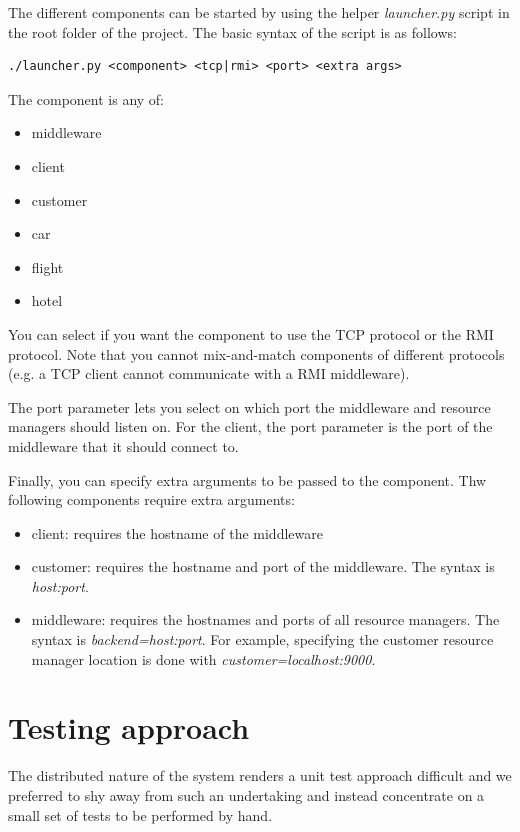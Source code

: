 \documentclass[11pt]{article}
\begin{document}
The different components can be started by using the helper {\it
  launcher.py} script in the root folder of the project.  The basic
syntax of the script is as follows:


\begin{verbatim}
./launcher.py <component> <tcp|rmi> <port> <extra args>
\end{verbatim}

The component is any of:

\begin{itemize}
\item middleware
\item client
\item customer
\item car
\item flight
\item hotel
\end{itemize}

You can select if you want the component to use the TCP protocol or
the RMI protocol.  Note that you cannot mix-and-match components of
different protocols (e.g. a TCP client cannot communicate with a RMI
middleware).

The port parameter lets you select on which port the middleware and
resource managers should listen on.  For the client, the port
parameter is the port of the middleware that it should connect to.

Finally, you can specify extra arguments to be passed to the
component.  Thw following components require extra arguments:

\begin{itemize}
\item client: requires the hostname of the middleware
\item customer: requires the hostname and port of the middleware.  The
  syntax is {\it host:port}.
\item middleware: requires the hostnames and ports of all resource
  managers.  The syntax is {\it backend=host:port}.  For example,
  specifying the customer resource manager location is done with {\it
    customer=localhost:9000}.
\end{itemize}




\section{Testing approach}

The distributed nature of the system renders a unit test approach
difficult and we preferred to shy away from such an undertaking and
instead concentrate on a small set of tests to be performed by hand.
\end{document}

